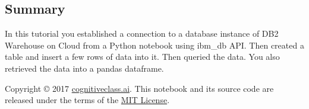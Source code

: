 \documentclass[11pt]{article}
\begin{document}
    \subsection{Summary}\label{summary}

In this tutorial you established a connection to a database instance of
DB2 Warehouse on Cloud from a Python notebook using ibm\_db API. Then
created a table and insert a few rows of data into it. Then queried the
data. You also retrieved the data into a pandas dataframe.

    Copyright © 2017
\href{cognitiveclass.ai?utm_source=bducopyrightlink\&utm_medium=dswb\&utm_campaign=bdu}{cognitiveclass.ai}.
This notebook and its source code are released under the terms of the
\href{https://bigdatauniversity.com/mit-license/}{MIT License}.


    
    
    
    
\end{document}
